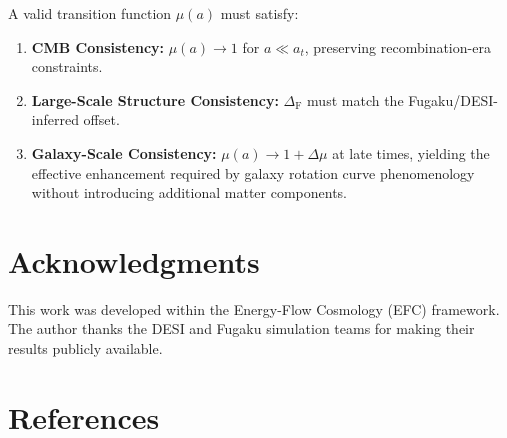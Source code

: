 \documentclass[12pt,a4paper]{article}
\newcommand{\DeltaF}{\Delta_{\mathrm{F}}}
\newcommand{\Deltamu}{\Delta\mu}
\begin{document}
A valid transition function $\mu(a)$ must satisfy:

\begin{enumerate}[leftmargin=2em,itemsep=0.5em]
    \item \textbf{CMB Consistency:} $\mu(a) \to 1$ for $a \ll a_t$, preserving recombination-era constraints.
    
    \item \textbf{Large-Scale Structure Consistency:} $\DeltaF$ must match the Fugaku/DESI-inferred offset.
    
    \item \textbf{Galaxy-Scale Consistency:} $\mu(a) \to 1 + \Deltamu$ at late times, yielding the effective enhancement required by galaxy rotation curve phenomenology without introducing additional matter components.
\end{enumerate}

\section*{Acknowledgments}

This work was developed within the Energy-Flow Cosmology (EFC) framework. The author thanks the DESI and Fugaku simulation teams for making their results publicly available.

\section*{References}
\end{document}
